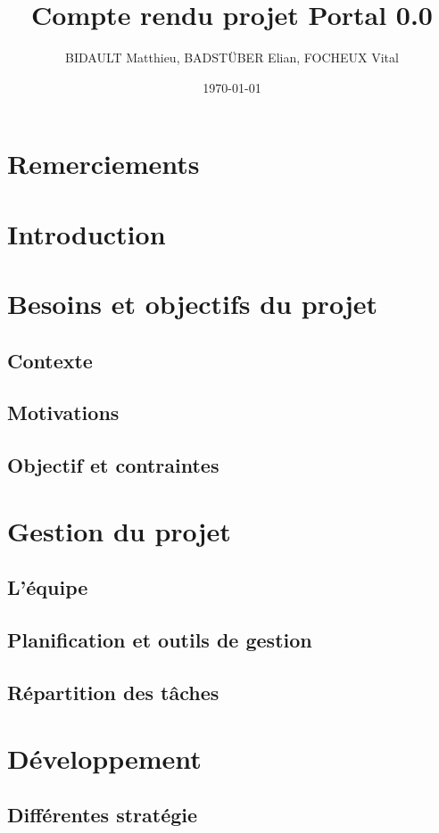 \documentclass[12pt]{report}
\title{Compte rendu projet Portal 0.0}
\author{BIDAULT Matthieu, BADSTÜBER Elian, FOCHEUX Vital}
\date{\today}
\begin{document}
\maketitle

\section*{Remerciements}


\tableofcontents

\section{Introduction}

\section{Besoins et objectifs du projet}
\subsection{Contexte}
\subsection{Motivations}
\subsection{Objectif et contraintes}

\section{Gestion du projet}
\subsection{L'équipe}
\subsection{Planification et outils de gestion}
\subsection{Répartition des tâches}

\section{Développement}
\subsection{Différentes stratégie}
\end{document}
